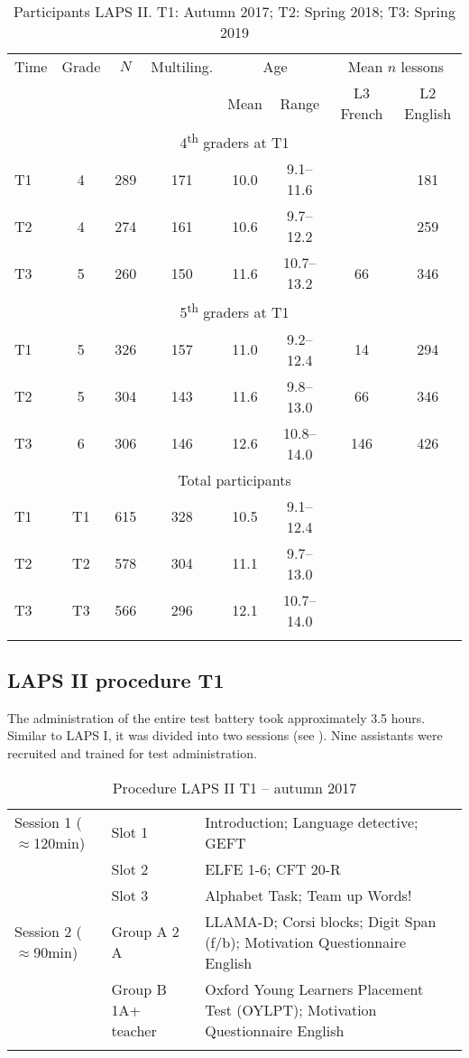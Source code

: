 \documentclass[output=paper]{langsci/langscibook}
\begin{document}
\begin{table}
\begin{tabular}{lccccccc} 
\lsptoprule
Time &	Grade &	$N$ & Multiling. & \multicolumn{2}{c}{Age} & \multicolumn{2}{c}{Mean $n$ lessons}\\\cmidrule(lr){5-6}\cmidrule(lr){7-8}
     &        &     &              &  Mean & Range & L3 French & L2 English\\\midrule
\multicolumn{8}{c}{4\textsuperscript{th} graders at T1}\\\midrule
T1 & 4 & 289 & 171 & 10.0 & 9.1--11.6  &    & 181\\
T2 & 4 & 274 & 161 & 10.6 & 9.7--12.2  &    & 259\\
T3 & 5 & 260 & 150 & 11.6 & 10.7--13.2 & 66 & 346\\\midrule
\multicolumn{8}{c}{5\textsuperscript{th} graders at T1}\\\midrule
T1 & 5 & 326 & 157 & 11.0 & 9.2--12.4 & 14 & 294\\
T2 & 5 & 304 & 143 & 11.6 & 9.8--13.0 & 66 & 346\\
T3 & 6 & 306 & 146 & 12.6 & 10.8--14.0 & 146 & 426\\\midrule
\multicolumn{8}{c}{Total participants}\\\midrule
T1 & T1 & 615 & 328 & 10.5 & 9.1--12.4 &   & \\
T2 & T2 & 578 & 304 & 11.1 & 9.7--13.0 &   & \\
T3 & T3 & 566 & 296 & 12.1 & 10.7--14.0&   & \\
\lspbottomrule
\end{tabular}
\caption{Participants LAPS II. T1: Autumn 2017; T2: Spring 2018; T3: Spring 2019\label{tab:02:5}}
\end{table}

 \subsection{LAPS II procedure T1}

The administration of the entire test battery took approximately 3.5 hours. Similar to LAPS I, it was divided into two sessions (see ). Nine assistants were recruited and trained for test administration.

\begin{table}
\begin{tabularx}{\textwidth}{llQ}
\lsptoprule
Session 1 (${\approx}$120min) & Slot 1 & Introduction; Language detective; GEFT\\
& Slot 2 & ELFE 1-6; CFT 20-R\\
& Slot 3 & Alphabet Task; Team up Words!\\
Session 2 (${\approx}$90min) & Group A 2 A & LLAMA-D; Corsi blocks; Digit Span (f/b); Motivation Questionnaire English\\
& Group B 1A+ teacher & Oxford Young Learners Placement Test (OYLPT); Motivation Questionnaire English\\
\lspbottomrule
\end{tabularx}
\caption{Procedure LAPS II T1 – autumn 2017\label{tab:02:6}}
\end{table}
\end{document}
